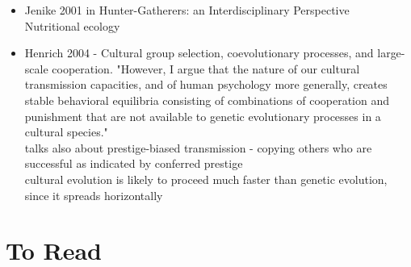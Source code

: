 \documentclass[11pt,oneside,a4paper,onecolumn]{article}
\begin{document}
\begin{itemize}
	\item Jenike 2001 in Hunter-Gatherers: an Interdisciplinary Perspective\\
	Nutritional ecology
	
	\item Henrich 2004 - Cultural group selection, coevolutionary processes, and large-scale cooperation.  
	"However, I argue that the nature of our cultural transmission capacities, and of human psychology more generally, creates stable behavioral equilibria consisting of combinations of cooperation and punishment that are not available to genetic evolutionary processes in a cultural species." \\
	talks also about prestige-biased transmission - copying others who are successful as indicated by conferred prestige \\
	cultural evolution is likely to proceed much faster than genetic evolution, since it spreads horizontally
	


\end{itemize}

\section{To Read}
\end{document}
